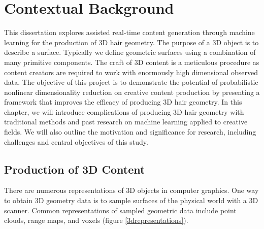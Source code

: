 \documentclass[ %
author={Dillon Keith Diep},
supervisor={Dr. Carl Henrik Ek},
degree={MEng},
title={ART-CG Hair:},
subtitle={Assisted Real-time Content Generation of Stylised Virtual Hair},
type={Research},
year={2017} ]{dissertation}
\begin{document}

%

\mainmatter


\chapter{Contextual Background}
\label{chap:context}
This dissertation explores assisted real-time content generation through machine learning for the production of 3D hair geometry.
The purpose of a 3D object is to describe a surface. Typically we define geometric surfaces using a combination of many primitive components. The craft of 3D content is a meticulous procedure as content creators are required to work with enormously high dimensional observed data.
The objective of this project is to demonstrate the potential of probabilistic nonlinear dimensionality reduction on creative content production by presenting a framework that improves the efficacy of producing 3D hair geometry. 
In this chapter, we will introduce complications of producing 3D hair geometry with traditional methods and past research on machine learning applied to creative fields. We will also outline the motivation and significance for research, including challenges and central objectives of this study.

\section{Production of 3D Content}
There are numerous representations of 3D objects in computer graphics. One way to obtain 3D geometry data is to sample surfaces of the physical world with a 3D scanner. Common representations of sampled geometric data include point clouds, range maps, and voxels (figure \ref{3drepresentations}).
\end{document}
